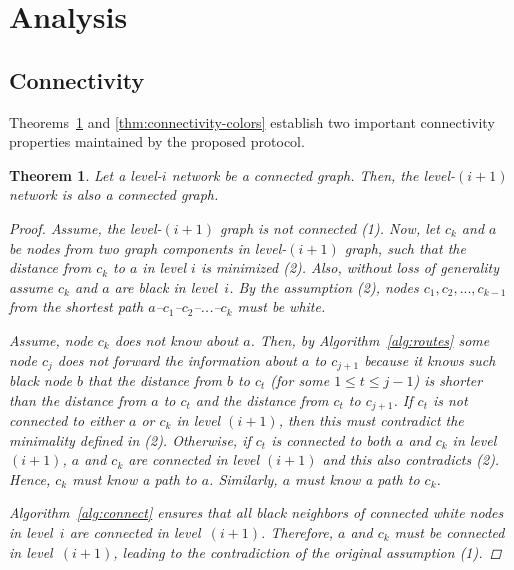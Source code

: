 \documentclass[conference]{IEEEtran}
\newtheorem{thm}{Theorem}
\theoremstyle{definition}
\begin{document}
\section{Analysis}
\label{sec:analysis}

\subsection{Connectivity}
\label{sec:analysis:connectivity}

Theorems~\ref{thm:connectivity-levels} and \ref{thm:connectivity-colors} establish 
two important connectivity properties maintained by the proposed protocol.

\begin{thm}
    Let a level-$i$ network be a connected graph. Then, the level-$(i+1)$ network is also a connected graph.

    \begin{proof}
        Assume, the level-$(i+1)$ graph is not connected (1). Now, let $c_k$ and $a$ be nodes from two graph components in level-$(i+1)$ graph, such that the distance from $c_k$ to $a$ in level $i$ is minimized (2). Also, without loss of generality assume $c_k$ and $a$ are black in level~$i$. By the assumption (2), nodes $c_1,c_2,...,c_{k-1}$ from the shortest path  $a$--$c_1$--$c_2$--...--$c_k$ must be white.

        Assume, node $c_k$ does not know about $a$. Then, by Algorithm~\ref{alg:routes} some node $c_j$ does not forward the information about $a$ to $c_{j+1}$ because it knows such black node $b$ that the distance from $b$ to $c_t$ (for some $1 \le t \le j - 1$) is shorter than the distance from $a$ to $c_t$ and the distance from $c_t$ to $c_{j+1}$. If $c_t$ is not connected to either $a$ or $c_k$ in level $(i+1)$, then this must contradict the minimality defined in (2). Otherwise, if $c_t$ is connected to both $a$ and $c_k$ in level $(i+1)$, $a$ and $c_k$ are connected in level $(i+1)$ and this also contradicts (2). Hence, $c_k$ must know a path to $a$. Similarly, $a$ must know a path to $c_k$.

        Algorithm~\ref{alg:connect} ensures that all black neighbors of connected white nodes in level~$i$ are connected in level~$(i+1)$. Therefore, $a$ and $c_k$ must be connected in level~$(i+1)$, leading to the contradiction of the original assumption (1).
    \end{proof}

    \label{thm:connectivity-levels}
\end{thm}
\end{document}
